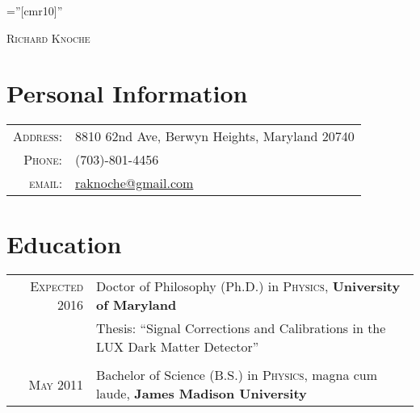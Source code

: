 \documentclass[a4paper,10pt]{article}
\begin{document}

\pagestyle{empty} %

\font\fb=''[cmr10]'' %

\par{\centering
		{\Huge \textsc{Richard Knoche}
	}\bigskip\par}

\section{Personal Information}

\begin{tabular}{rl}
    \textsc{Address:}   & 8810 62nd Ave, Berwyn Heights, Maryland 20740 \\
    \textsc{Phone:}     & (703)-801-4456\\
    \textsc{email:}     & \href{mailto:raknoche@gmail.com}{raknoche@gmail.com}
\end{tabular}

\section{Education}
\begin{tabular}{rl}	
 \textsc{Expected} 2016 & Doctor of Philosophy (Ph.D.) in \textsc{Physics}, \textbf{University of Maryland}\\
& Thesis: ``Signal Corrections and Calibrations in the LUX Dark Matter Detector'' \\&\\
\textsc{May} 2011& Bachelor of Science (B.S.) in \textsc{Physics}, magna cum laude,  \textbf{James Madison University} 
\end{tabular}

\end{document}
